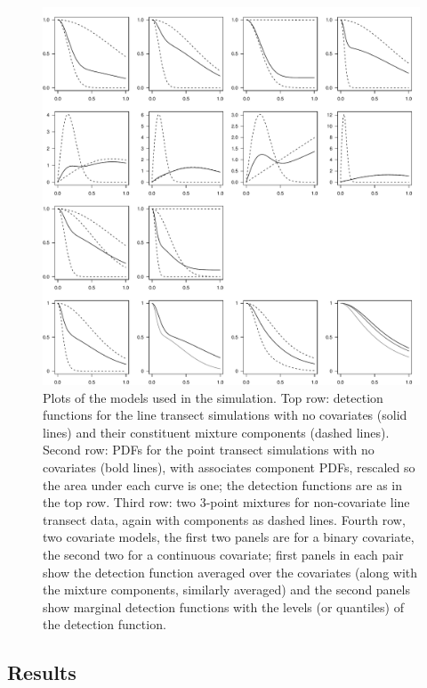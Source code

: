 \begin{figure}
\centering
\includegraphics[width=\textwidth]{mix/figs/sim-detfct.pdf}
\caption{Plots of the models used in the simulation. Top row: detection functions for the line transect simulations with no covariates (solid lines) and their constituent mixture components (dashed lines). Second row: PDFs for the point transect simulations with no covariates (bold lines), with associates component PDFs, rescaled so the area under each curve is one; the detection functions are as in the top row. Third row: two 3-point mixtures for non-covariate line transect data, again with components as dashed lines. Fourth row, two covariate models, the first two panels are for a binary covariate, the second two for a continuous covariate; first panels in each pair show the detection function averaged over the covariates (along with the mixture components, similarly averaged) and the second panels show marginal detection functions with the levels (or quantiles) of the detection function.}
\label{sim-detfcts}
\end{figure}

\subsection{Results}

